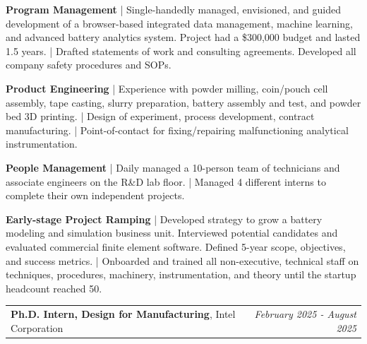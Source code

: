 \documentclass[letterpaper,10.8pt]{article}
\newcommand{\resumeItemListStart}{\begin{itemize}[leftmargin=*]}
\newcommand{\resumeItemListEnd}{\end{itemize}\vspace{-5pt}}
\begin{document}
\resumeItemListStart
{\vspace{-2pt}\item\small{\textbf{Program Management} | Single-handedly managed, envisioned, and guided development of a browser-based integrated data management, machine learning, and advanced battery analytics system. Project had a \$300,000 budget and lasted 1.5 years. | Drafted statements of work and consulting agreements. Developed all company safety procedures and SOPs. \vspace{-2pt}}}

{\vspace{-2pt}\item\small{\textbf{Product Engineering} | Experience with powder milling, coin/pouch cell assembly, tape casting, slurry preparation, battery assembly and test, and powder bed 3D printing. | Design of experiment, process development, contract manufacturing. | Point-of-contact for fixing/repairing malfunctioning analytical instrumentation. \vspace{-2pt}}} 

{\vspace{-2pt}\item\small{\textbf{People Management} | Daily managed a 10-person team of technicians and associate engineers on the R\&D lab floor. | Managed 4 different interns to complete their own independent projects. \vspace{-2pt}}} 

{\vspace{-2pt}\item\small{\textbf{Early-stage Project Ramping} | Developed strategy to grow a battery modeling and simulation business unit. Interviewed potential candidates and evaluated commercial finite element software. Defined 5-year scope, objectives, and success metrics. | Onboarded and trained all non-executive, technical staff on techniques, procedures, machinery, instrumentation, and theory until the startup headcount reached 50. \vspace{-2pt}}}
\resumeItemListEnd

{\vspace{-1pt}\item\begin{tabular*}{0.97\textwidth}{l@{\extracolsep{\fill}}r}
\textbf{Ph.D. Intern, Design for Manufacturing}, 
{Intel Corporation} & 
\textit{\small February 2025 - August 2025} 
\end{tabular*}\vspace{-4pt}}
\end{document}
